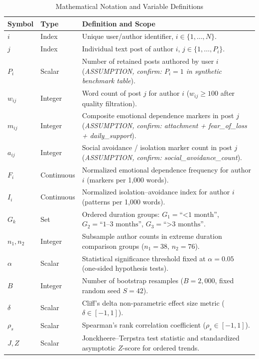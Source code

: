 
\begin{table}[t]
\centering
\small
\caption{Mathematical Notation and Variable Definitions}
\label{tab:notation}
\begin{tabular}{llp{7.5cm}}
\toprule
\textbf{Symbol} & \textbf{Type} & \textbf{Definition and Scope} \\
\midrule
$i$ & Index & Unique user/author identifier, $i \in \{1, \dots, N\}$. \\
$j$ & Index & Individual text post of author $i$, $j \in \{1, \dots, P_i\}$. \\
$P_i$ & Scalar & Number of retained posts authored by user $i$ (\textit{ASSUMPTION, confirm: $P_i = 1$ in synthetic benchmark table}). \\
$w_{ij}$ & Integer & Word count of post $j$ for author $i$ ($w_{ij} \ge 100$ after quality filtration). \\
$m_{ij}$ & Integer & Composite emotional dependence markers in post $j$ (\textit{ASSUMPTION, confirm: attachment + fear\_of\_loss + daily\_support}). \\
$a_{ij}$ & Integer & Social avoidance / isolation marker count in post $j$ (\textit{ASSUMPTION, confirm: social\_avoidance\_count}). \\
$F_i$ & Continuous & Normalized emotional dependence frequency for author $i$ (markers per 1,000 words). \\
$I_i$ & Continuous & Normalized isolation--avoidance index for author $i$ (patterns per 1,000 words). \\
$G_k$ & Set & Ordered duration groups: $G_1 = \text{``<1 month''}$, $G_2 = \text{``1--3 months''}$, $G_3 = \text{``>3 months''}$. \\
$n_1, n_2$ & Integer & Subsample author counts in extreme duration comparison groups ($n_1 = 38$, $n_2 = 76$). \\
$\alpha$ & Scalar & Statistical significance threshold fixed at $\alpha = 0.05$ (one-sided hypothesis tests). \\
$B$ & Integer & Number of bootstrap resamples ($B = 2{,}000$, fixed random seed $S = 42$). \\
$\delta$ & Scalar & Cliff's delta non-parametric effect size metric ($\delta \in [-1, 1]$). \\
$\rho_s$ & Scalar & Spearman's rank correlation coefficient ($\rho_s \in [-1, 1]$). \\
$J, Z$ & Scalar & Jonckheere--Terpstra test statistic and standardized asymptotic $Z$-score for ordered trends. \\
\bottomrule
\end{tabular}
\end{table}

